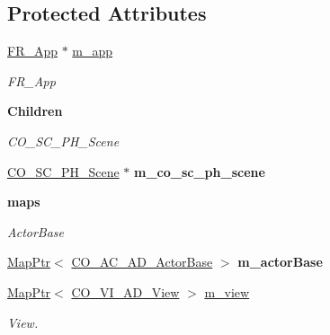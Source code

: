 \subsection*{Protected Attributes}
\begin{DoxyCompactItemize}
\item 
\hypertarget{classContent_1_1Scene_1_1Admin_1_1Scene_ab4f6a612165d9dd6531136c4d0310749}{
\hyperlink{classFramework_1_1App}{FR\_\-App} $\ast$ \hyperlink{classContent_1_1Scene_1_1Admin_1_1Scene_ab4f6a612165d9dd6531136c4d0310749}{m\_\-app}}
\label{classContent_1_1Scene_1_1Admin_1_1Scene_ab4f6a612165d9dd6531136c4d0310749}

\begin{DoxyCompactList}\small\item\em FR\_\-App \item\end{DoxyCompactList}\end{DoxyCompactItemize}
\begin{Indent}{\bf Children}\par
{\em \label{_amgrp64e4aca4297806247f62a7b5f8cbd3df}
 CO\_\-SC\_\-PH\_\-Scene }\begin{DoxyCompactItemize}
\item 
\hypertarget{classContent_1_1Scene_1_1Admin_1_1Scene_a7d2a61f3f520db6230d2c7dc6f384f1f}{
\hyperlink{classContent_1_1Scene_1_1Physics_1_1Scene}{CO\_\-SC\_\-PH\_\-Scene} $\ast$ {\bfseries m\_\-co\_\-sc\_\-ph\_\-scene}}
\label{classContent_1_1Scene_1_1Admin_1_1Scene_a7d2a61f3f520db6230d2c7dc6f384f1f}

\end{DoxyCompactItemize}
\end{Indent}
\begin{Indent}{\bf maps}\par
{\em \label{_amgrp7e94476d62556cc8501e3df5b8d6470d}
 ActorBase }\begin{DoxyCompactItemize}
\item 
\hypertarget{classContent_1_1Scene_1_1Admin_1_1Scene_a789c7497f18c373a8d9109c721b1af80}{
\hyperlink{classMapPtr}{MapPtr}$<$ \hyperlink{classContent_1_1Actor_1_1Admin_1_1ActorBase}{CO\_\-AC\_\-AD\_\-ActorBase} $>$ {\bfseries m\_\-actorBase}}
\label{classContent_1_1Scene_1_1Admin_1_1Scene_a789c7497f18c373a8d9109c721b1af80}

\item 
\hypertarget{classContent_1_1Scene_1_1Admin_1_1Scene_a01d7b61841cf3c7176fe5a93c3af2895}{
\hyperlink{classMapPtr}{MapPtr}$<$ \hyperlink{classContent_1_1View_1_1Admin_1_1View}{CO\_\-VI\_\-AD\_\-View} $>$ \hyperlink{classContent_1_1Scene_1_1Admin_1_1Scene_a01d7b61841cf3c7176fe5a93c3af2895}{m\_\-view}}
\label{classContent_1_1Scene_1_1Admin_1_1Scene_a01d7b61841cf3c7176fe5a93c3af2895}

\begin{DoxyCompactList}\small\item\em View. \item\end{DoxyCompactList}\end{DoxyCompactItemize}
\end{Indent}
